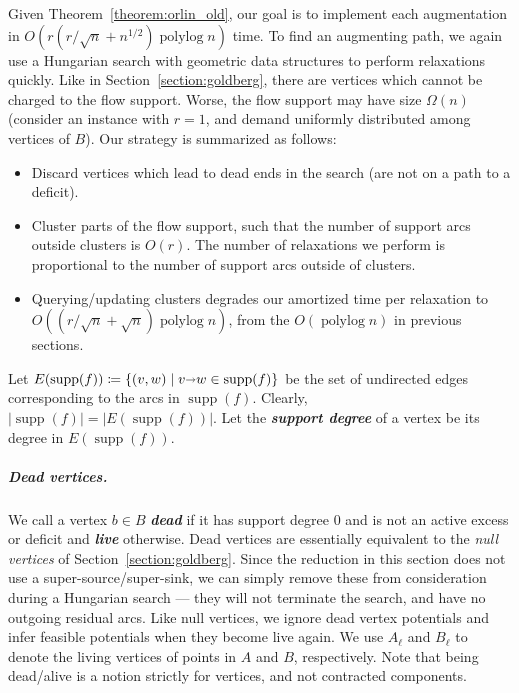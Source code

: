 \documentclass[a4paper,UKenglish]{socg-lipics-v2018}
\def\polylog{\mathop{\mathrm{polylog}}}
\def\abs#1{\mathopen| #1 \mathclose|}		%
\def\arcto{\mathord\shortrightarrow}
\def\arc#1#2{#1\arcto#2}
\def\supp{\operatorname{supp}}
\theoremstyle{plain}
\numberwithin{figure}{section}
\renewcommand{\paragraph}{\subparagraph}
\def\EMPH#1{\textbf{\emph{\boldmath #1}}}
\begin{document}
Given Theorem~\ref{theorem:orlin_old}, our goal is to implement each
augmentation in $O(r(r/\sqrt{n} + n^{1/2})\polylog n)$ time.
To find an augmenting path, we again use a Hungarian search with geometric data
structures to perform relaxations quickly.
Like in Section~\ref{section:goldberg}, there are vertices which cannot be
charged to the flow support.
Worse, the flow support may have size $\Omega(n)$ (consider an instance with
$r=1$, and demand uniformly distributed among vertices of $B$).
Our strategy is summarized as follows:
\begin{itemize}
\item Discard vertices which lead to dead ends in the search (are not on a path
	to a deficit).
\item Cluster parts of the flow support, such that the number of support arcs
	outside clusters is $O(r)$.
	The number of relaxations we perform is proportional to the number of
	support arcs outside of clusters.
\item Querying/updating clusters degrades our amortized time per relaxation to
	$O((r/\sqrt{n}+\sqrt{n})\polylog n)$, from the $O(\polylog n)$ in
	previous sections.
\end{itemize}

Let $E(\supp(f)) \coloneqq \{(v, w) \mid \arc vw \in \supp(f)\}$ be the set
of undirected edges corresponding to the arcs in $\supp(f)$.
Clearly, $\abs{\supp(f)} = \abs{E(\supp(f))}$.
Let the \EMPH{support degree} of a vertex be its degree in $E(\supp(f))$.

\paragraph{Dead vertices.}
We call a vertex $b \in B$ \EMPH{dead} if it has support degree 0 and is not an
active excess or deficit and \EMPH{live} otherwise.
Dead vertices are essentially equivalent to the \emph{null vertices} of
Section~\ref{section:goldberg}.
Since the reduction in this section does not use a super-source/super-sink,
we can simply remove these from consideration during a Hungarian search ---
they will not terminate the search, and have no outgoing residual arcs.
Like null vertices, we ignore dead vertex potentials and infer feasible
potentials when they become live again.
We use \EMPH{$A_\ell$} and \EMPH{$B_\ell$} to denote the living
vertices of points in $A$ and $B$, respectively.
Note that being dead/alive is a notion strictly for vertices, and not
contracted components.
\end{document}
